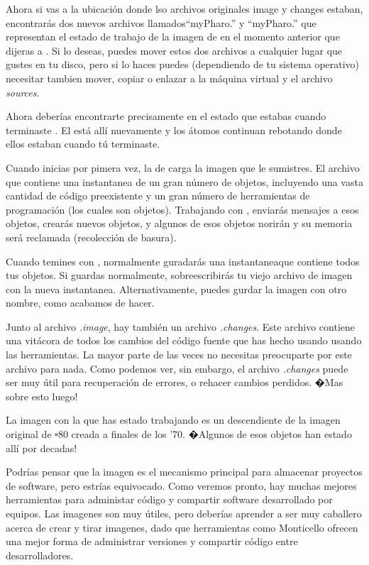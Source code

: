 \documentclass[a4paper,10pt,twoside]{book}
\begin{document}
Ahora si vas a la ubicaci\'on donde lso archivos originales image y changes estaban, encontrar\'as dos nuevos archivos llamados``myPharo.'' y ``myPharo.'' que representan el estado de trabajo de la imagen de \pharo en el momento anterior que dijeras a \pharo {}.
Si lo deseas, puedes mover estos dos archivos a cualquier lugar que gustes en tu disco, pero si lo haces puedes (dependiendo de tu sistema operativo) necesitar tambien mover, copiar o enlazar a la m\'aquina virtual y el archivo \emph{sources}.


Ahora deber\'ias encontrarte precisamente en el estado que estabas cuando terminaste \pharo. El \bam est\'a all\'i nuevamente y los \'atomos continuan rebotando donde ellos estaban cuando t\'u terminaste.

Cuando inicias \pharo por pimera vez, la  de \pharo carga la imagen que le sumistres. El archivo que contiene una instantanea de un gran n\'umero de objetos, incluyendo una vasta cantidad de c\'odigo preexistente y un gran n\'umero de herramientas de programaci\'on (los cuales son objetos). Trabajando con \pharo, enviar\'as mensajes a esos objetos, crear\'as nuevos objetos, y algunos de esos objetos norir\'an y su memoria ser\'a reclamada (\ie recolecci\'on de basura).

Cuando temines con \pharo, normalmente guradar\'as una instantaneaque contiene todos tus objetos. Si guardas normalmente, sobreescribir\'as tu viejo archivo de imagen con la nueva instantanea. Alternativamente, puedes gurdar la imagen con otro nombre, como acabamos de hacer.

Junto al archivo \emph{.image}, hay tambi\'en un archivo \emph{.changes}.
Este archivo contiene una vit\'acora de todos los cambios del c\'odigo fuente que has hecho usando usando las herramientas.
La mayor parte de las veces no necesitas preocuparte por este archivo para nada.
Como podemos ver, sin embargo, el archivo \emph{.changes} puede ser muy \'util para recuperaci\'on de errores, o rehacer cambios perdidos.
�Mas sobre esto luego!

La imagen con la que has estado trabajando es un descendiente de la imagen original de \st-80 creada a finales de los '70.
�Algunos de esos objetos han estado all\'i por decadas!

Podr\'ias pensar que la imagen es el mecanismo principal para almacenar proyectos de software, pero estr\'ias equivocado.
Como veremos pronto, hay muchas mejores herramientas para administar c\'odigo y compartir software desarrollado por equipos.
Las imagenes son muy \'utiles, pero deber\'ias aprender a ser muy caballero acerca de crear y tirar imagenes, dado que herramientas como Monticello ofrecen una mejor forma de administrar versiones y compartir c\'odigo entre desarrolladores.
\end{document}
